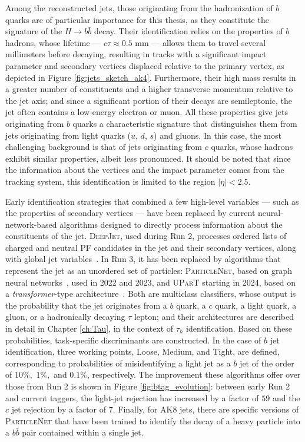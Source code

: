 Among the reconstructed jets, those originating from the hadronization of $b$ quarks are of particular importance for this thesis, as they constitute the signature of the $H\to b\bar{b}$ decay. Their identification relies on the properties of $b$ hadrons, whose lifetime — $c\tau\approx0.5$ mm — allows them to travel several millimeters before decaying, resulting in tracks with a significant impact parameter and secondary vertices displaced relative to the primary vertex, as depicted in Figure \ref{fig:jets_sketch_ak4}. Furthermore, their high mass results in a greater number of constituents and a higher transverse momentum relative to the jet axis; and since a significant portion of their decays are semileptonic, the jet often contains a low-energy electron or muon. All these properties give jets originating from $b$ quarks a characteristic signature that distinguishes them from jets originating from light quarks ($u$, $d$, $s$) and gluons. In this case, the most challenging background is that of jets originating from $c$ quarks, whose hadrons exhibit similar properties, albeit less pronounced. It should be noted that since the information about the vertices and the impact parameter comes from the tracking system, this identification is limited to the region $|\eta| < 2.5$.

Early identification strategies that combined a few high-level variables — such as the properties of secondary vertices — have been replaced by current neural-network-based algorithms designed to directly process information about the constituents of the jet. \textsc{DeepJet}, used during Run 2, processes ordered lists of charged and neutral PF candidates in the jet and their secondary vertices, along with global jet variables~\cite{Bols:2020bkb}. In Run 3, it has been replaced by algorithms that represent the jet as an unordered set of particles: \textsc{ParticleNet}, based on graph neural networks~\cite{PNet}, used in 2022 and 2023, and \textsc{UParT} starting in 2024, based on a \textit{transformer}-type architecture~\cite{Qu:2022mxj,CMS-UParT}. Both are multiclass classifiers, whose output is the probability that the jet originates from a $b$ quark, a $c$ quark, a light quark, a gluon, or a hadronically decaying $\tau$ lepton; and their architectures are described in detail in Chapter \ref{ch:Tau}, in the context of $\tau_h$ identification. Based on these probabilities, task-specific discriminants are constructed. In the case of $b$ jet identification, three working points, Loose, Medium, and Tight, are defined, corresponding to probabilities of misidentifying a light jet as a $b$ jet of the order of $10\%,$ $1\%,$ and $0.1\%$, respectively. The improvement these algorithms offer over those from Run 2 is shown in Figure \ref{fig:btag_evolution}: between early Run 2 and current taggers, the light-jet rejection has increased by a factor of $59$ and the $c$ jet rejection by a factor of $7$. Finally, for AK8 jets, there are specific versions of \textsc{ParticleNet} that have been trained to identify the decay of a heavy particle into a $b\bar{b}$ pair contained within a single jet.


